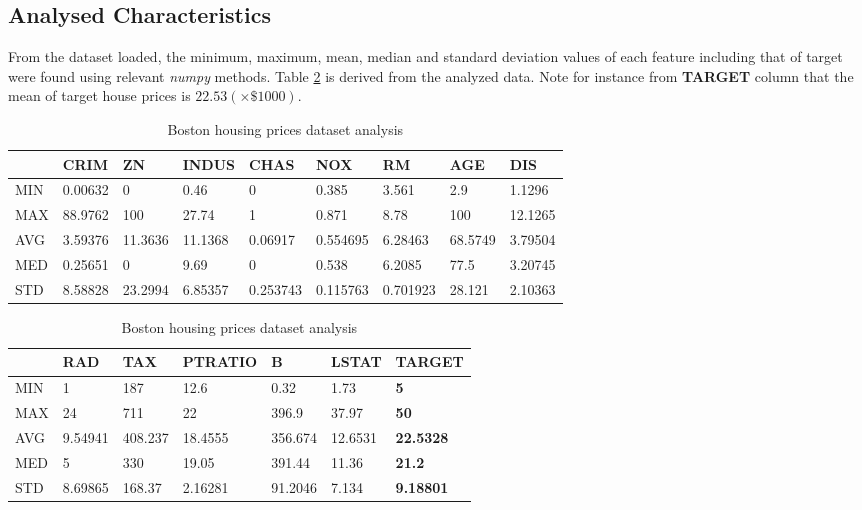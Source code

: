 \documentclass{article}
\begin{document}
	\subsection{Analysed Characteristics}
	From the dataset loaded, the minimum, maximum, mean, median and standard deviation values of each feature including that of target were found using relevant \emph{numpy} methods. Table \ref{tab:datasetAnalysisTable} is derived from the analyzed data. Note for instance from \textbf{TARGET} column that the mean of target house prices is $22.53 (\times \$1000)$.
	\begin{table}[ht]
		\centering
		\begin{tabularx}{\textwidth}{l|XXXXXXXX}
			\hline
			&     CRIM &       ZN &    INDUS &     CHAS &      NOX &       RM &      AGE &      DIS \\
			\hline
			MIN &  0.00632 &   0      &  0.46    & 0        & 0.385    & 3.561    &   2.9    &  1.1296  \\
			MAX & 88.9762  & 100      & 27.74    & 1        & 0.871    & 8.78     & 100      & 12.1265  \\
			AVG &  3.59376 &  11.3636 & 11.1368  & 0.06917  & 0.554695 & 6.28463  &  68.5749 &  3.79504 \\
			MED &  0.25651 &   0      &  9.69    & 0        & 0.538    & 6.2085   &  77.5    &  3.20745 \\
			STD &  8.58828 &  23.2994 &  6.85357 & 0.253743 & 0.115763 & 0.701923 &  28.121  &  2.10363 \\
		\end{tabularx}		
		\begin{tabularx}{\textwidth}{l|XXXXX >{\bfseries}X}
			\hline
			&      RAD &     TAX &   PTRATIO &        B &   LSTAT &   TARGET \\
			\hline
			MIN &  1       & 187     &  12.6     &   0.32   &  1.73   &  5       \\
			MAX & 24       & 711     &  22       & 396.9    & 37.97   & 50       \\
			AVG &  9.54941 & 408.237 &  18.4555  & 356.674  & 12.6531 & 22.5328  \\
			MED &  5       & 330     &  19.05    & 391.44   & 11.36   & 21.2     \\
			STD &  8.69865 & 168.37  &   2.16281 &  91.2046 &  7.134  &  9.18801 \\
			\hline
		\end{tabularx}
		\caption{Boston housing prices dataset analysis}
		\label{tab:datasetAnalysisTable}	
	\end{table}
\end{document}
